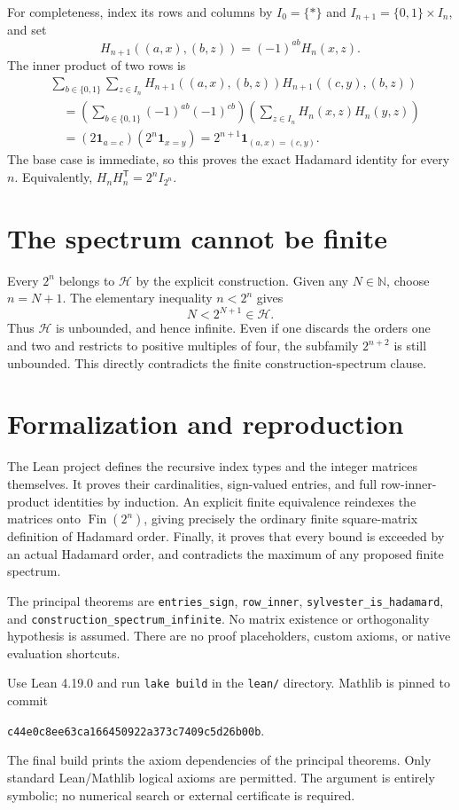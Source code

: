 \documentclass[11pt]{article}
\begin{document}
For completeness, index its rows and columns by $I_0=\{*\}$ and $I_{n+1}=\{0,1\}\times I_n$, and set
\[
H_{n+1}((a,x),(b,z))=(-1)^{ab}H_n(x,z).
\]
The inner product of two rows is
\begin{align*}
&\sum_{b\in\{0,1\}}\sum_{z\in I_n}
 H_{n+1}((a,x),(b,z))H_{n+1}((c,y),(b,z))\\
&\quad=\left(\sum_{b\in\{0,1\}}(-1)^{ab}(-1)^{cb}\right)
 \left(\sum_{z\in I_n}H_n(x,z)H_n(y,z)\right)\\
&\quad=(2\mathbf1_{a=c})(2^n\mathbf1_{x=y})
 =2^{n+1}\mathbf1_{(a,x)=(c,y)}.
\end{align*}
The base case is immediate, so this proves the exact Hadamard identity for every $n$. Equivalently, $H_nH_n^{\mathsf T}=2^n I_{2^n}$.

\section{The spectrum cannot be finite}
Every $2^n$ belongs to $\mathcal H$ by the explicit construction. Given any $N\in\mathbb N$, choose $n=N+1$. The elementary inequality $n<2^n$ gives
\[
N<2^{N+1}\in\mathcal H.
\]
Thus $\mathcal H$ is unbounded, and hence infinite. Even if one discards the orders one and two and restricts to positive multiples of four, the subfamily $2^{n+2}$ is still unbounded. This directly contradicts the finite construction-spectrum clause.

\section{Formalization and reproduction}
The Lean project defines the recursive index types and the integer matrices themselves. It proves their cardinalities, sign-valued entries, and full row-inner-product identities by induction. An explicit finite equivalence reindexes the matrices onto $\operatorname{Fin}(2^n)$, giving precisely the ordinary finite square-matrix definition of Hadamard order. Finally, it proves that every bound is exceeded by an actual Hadamard order, and contradicts the maximum of any proposed finite spectrum.

The principal theorems are \texttt{entries\_sign}, \texttt{row\_inner}, \texttt{sylvester\_is\_hadamard}, and \texttt{construction\_spectrum\_infinite}. No matrix existence or orthogonality hypothesis is assumed. There are no proof placeholders, custom axioms, or native evaluation shortcuts.

Use Lean 4.19.0 and run \texttt{lake build} in the \texttt{lean/} directory. Mathlib is pinned to commit
\begin{center}\texttt{c44e0c8ee63ca166450922a373c7409c5d26b00b}.\end{center}
The final build prints the axiom dependencies of the principal theorems. Only standard Lean/Mathlib logical axioms are permitted. The argument is entirely symbolic; no numerical search or external certificate is required.
\end{document}
